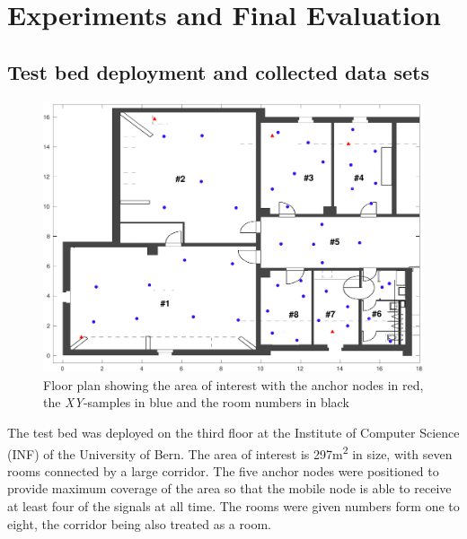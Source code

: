 \chapter{Experiments and Final Evaluation}
\newcommand{\rd}[1]{\textcolor{red}{#1}}
\newcommand{\gn}[1]{\textcolor{green}{#1}}

\label{Chapter5}


\section{Test bed deployment and collected data sets}
\label{TestBedDeployment}

\begin{figure}[ht]
\centering
\includegraphics[width=\textwidth]{Figures/FloorPlan_ANs}
\decoRule
\caption[Floor plan with anchor node placement]{Floor plan showing the area of interest with the anchor nodes in red, the \emph{XY}-samples in blue and the room numbers in black}
\label{fig:FloorPlanANs}
\end{figure}

The test bed was deployed on the third floor at the Institute of Computer Science (INF) of the University of Bern. The area of interest is 297m\textsuperscript{2} in size, with seven rooms connected by a large corridor. The five anchor nodes were positioned to provide maximum coverage of the area so that the mobile node is able to receive at least four of the signals at all time. The rooms were given numbers form one to eight, the corridor being also treated as a room.


